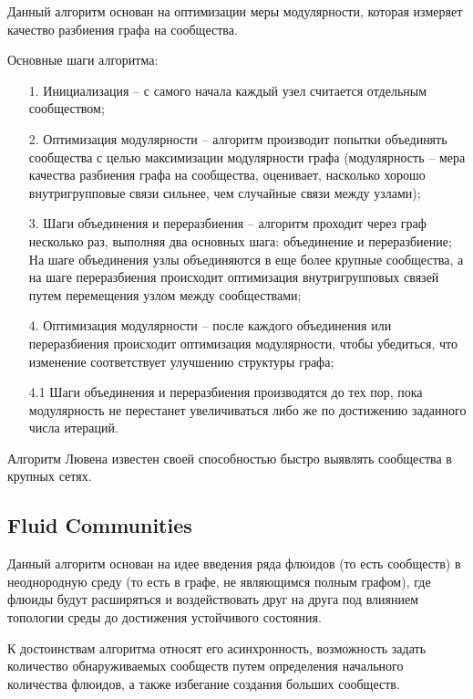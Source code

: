Данный алгоритм основан на оптимизации меры модулярности, которая измеряет качество разбиения графа на сообщества.

Основные шаги алгоритма:

\begin{enumerate}
	\item[1.] Инициализация -- с самого начала каждый узел считается отдельным сообществом;
	\item[2.] Оптимизация модулярности -- алгоритм производит попытки объединять сообщества с целью максимизации модулярности графа (модулярность -- мера качества разбиения графа на сообщества, оценивает, насколько хорошо внутригрупповые связи сильнее, чем случайные связи между узлами);
	\item[3.] Шаги объединения и переразбиения -- алгоритм проходит через граф несколько раз, выполняя два основных шага: объединение и переразбиение; На шаге объединения узлы объединяются в еще более крупные сообщества, а на шаге переразбиения происходит оптимизация внутригрупповых связей путем перемещения узлом между сообществами;
	\item[4.] Оптимизация модулярности -- после каждого объединения или переразбиения происходит оптимизация модулярности, чтобы убедиться, что изменение соответствует улучшению структуры графа;
	\item[4.1] Шаги объединения и переразбиения производятся до тех пор, пока модулярность не перестанет увеличиваться либо же по достижению заданного числа итераций. 
\end{enumerate}

Алгоритм Лювена известен своей способностью быстро выявлять сообщества в крупных сетях.

\subsection{Fluid Communities}

Данный алгоритм основан на идее введения ряда флюидов (то есть сообществ) в неоднородную среду (то есть в графе, не являющимся полным графом), где флюиды будут расширяться и воздействовать друг на друга под влиянием топологии среды до достижения устойчивого состояния.

К достоинствам алгоритма относят его асинхронность, возможность задать количество обнаруживаемых сообществ путем определения начального количества флюидов, а также избегание создания больших сообществ.

\pagebreak